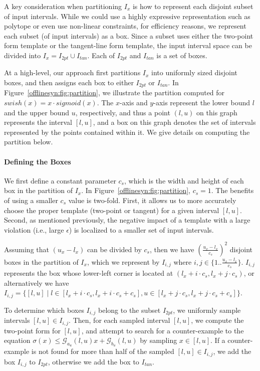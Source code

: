 A key consideration when partitioning $ I_x $ is how to represent each disjoint
subset of input intervals. While we could use a highly expressive representation such as polytope
or even use non-linear constraints, for efficiency reasons, we represent each
subset (of input intervals) as a box. Since a subset uses either the two-point
form template or the tangent-line form template, the input interval space can
be divided into
$I_x = I_{2pt}\cup I_{tan}$.
%
Each of $I_{2pt} $ and $ I_{tan} $ is  a set of boxes.


At a high-level, our
approach first partitions $ I_x $ into uniformly sized disjoint boxes, and then
assigns each box to either $ I_{2pt} $ or $ I_{tan} $. In
Figure~\ref{offlinesyn:fig:partition}, we illustrate the partition computed for $
swish(x)
= x \cdot sigmoid(x) $. The $x$-axis and $y$-axis represent the lower bound $ l
$ and
the upper bound $ u $, respectively, and thus a point $ (l, u) $ on this graph
represents the interval $ [l, u] $, and a box on this graph denotes  the set
of intervals represented by the points contained within it. We give details on
computing the partition below.

\paragraph{Defining the Boxes}

We first define a constant parameter $ c_s $, which is the width and height
of each box in the partition of $ I_x $. In Figure~\ref{offlinesyn:fig:partition},
$ c_s =
1 $. The benefits of using a smaller $ c_s $ value is two-fold. First, it allows
us to more accurately choose the proper template (two-point or tangent) for a
given interval $ [l, u] $. Second, as mentioned previously, the negative impact
of a template with a large violation (i.e., large $ \epsilon $) is localized to
a smaller set of input intervals.

Assuming that $ (u_x - l_x) $ can be divided by $c_s$, then we have $
(\frac{u_x -l_x}{c_s})^2 $ disjoint boxes in the partition of $ I_x $, which we
represent by $ I_{i,j} $ where $ i,j \in \{1..\frac{u_x - l_x}{c_s}\} $.
%
$ I_{i,j} $ represents the box whose lower-left corner is located at $ (l_x + i
\cdot c_s, l_x + j \cdot c_s) $, or
%
alternatively we have $ I_{i, j} = \{ [l,u] \mid l\in [l_x + i \cdot c_s, l_x +
i \cdot c_s + c_s], u \in [l_x + j \cdot c_s, l_x + j \cdot c_s + c_s]\}$.


To determine which boxes $ I_{i,j} $ belong to the subset $ I_{2pt} $, we
uniformly sample intervals $ [l, u] \in I_{i,j} $. Then, for each sampled
interval $ [l, u] $, we compute the two-point form for $ [l, u] $, and attempt
to search for a counter-example to the equation $ \sigma(x) \leq
\mathcal{G}_{a_u}(l, u)x + \mathcal{G}_{b_u}(l, u) $ by sampling $ x
\in [l, u] $.
%
If a counter-example is not found for more than half of the
sampled $ [l, u] \in I_{i,j} $, we add the box $ I_{i, j} $ to $ I_{2pt} $,
otherwise we add the box to $ I_{tan} $.

